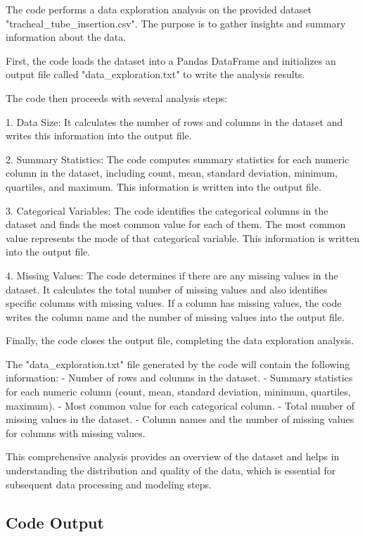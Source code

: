 \documentclass[11pt]{article}
\begin{document}
The code performs a data exploration analysis on the provided dataset "tracheal\_tube\_insertion.csv". The purpose is to gather insights and summary information about the data.

First, the code loads the dataset into a Pandas DataFrame and initializes an output file called "data\_exploration.txt" to write the analysis results.

The code then proceeds with several analysis steps:

1. Data Size: It calculates the number of rows and columns in the dataset and writes this information into the output file.

2. Summary Statistics: The code computes summary statistics for each numeric column in the dataset, including count, mean, standard deviation, minimum, quartiles, and maximum. This information is written into the output file.

3. Categorical Variables: The code identifies the categorical columns in the dataset and finds the most common value for each of them. The most common value represents the mode of that categorical variable. This information is written into the output file.

4. Missing Values: The code determines if there are any missing values in the dataset. It calculates the total number of missing values and also identifies specific columns with missing values. If a column has missing values, the code writes the column name and the number of missing values into the output file.

Finally, the code closes the output file, completing the data exploration analysis.

The "data\_exploration.txt" file generated by the code will contain the following information:
- Number of rows and columns in the dataset.
- Summary statistics for each numeric column (count, mean, standard deviation, minimum, quartiles, maximum).
- Most common value for each categorical column.
- Total number of missing values in the dataset.
- Column names and the number of missing values for columns with missing values.

This comprehensive analysis provides an overview of the dataset and helps in understanding the distribution and quality of the data, which is essential for subsequent data processing and modeling steps.

\subsection{Code Output}
\end{document}
